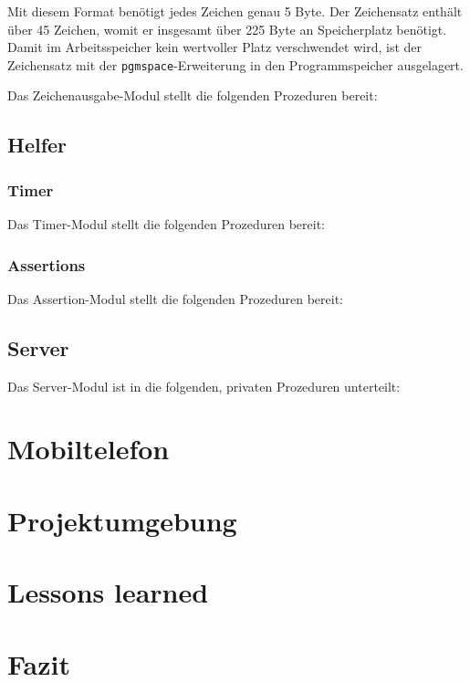 \documentclass[ngerman]{article}
\begin{document}
Mit diesem Format benötigt jedes Zeichen genau 5 Byte. Der Zeichensatz
enthält über 45 Zeichen, womit er insgesamt über 225 Byte an
Speicherplatz benötigt. Damit im Arbeitsspeicher kein wertvoller Platz  
verschwendet wird, ist der Zeichensatz mit der
{\tt pgmspace}-Erweiterung in den Programmspeicher ausgelagert.

Das Zeichenausgabe-Modul stellt die folgenden Prozeduren bereit:



\subsection{Helfer}


\subsubsection{Timer}

Das Timer-Modul stellt die folgenden Prozeduren bereit:



\subsubsection{Assertions}

Das Assertion-Modul stellt die folgenden Prozeduren bereit:



\subsection{Server}

Das Server-Modul ist in die folgenden, privaten Prozeduren unterteilt:



\section{Mobiltelefon}

\section{Projektumgebung}

\section{Lessons learned}

\section{Fazit}

\newpage

\appendix

\newpage



 
\end{document}
